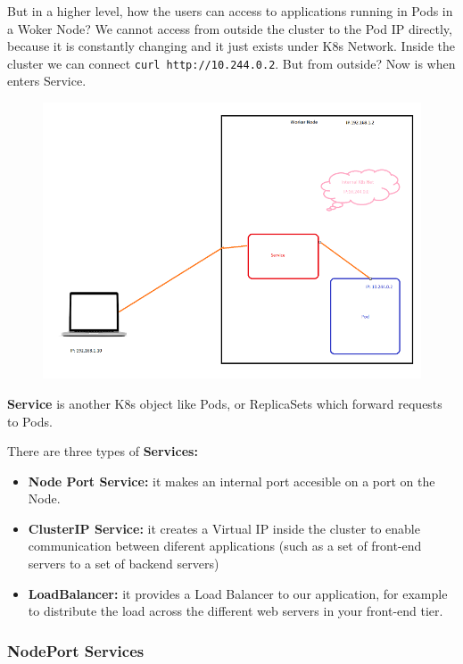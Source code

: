 \documentclass{article}
\begin{document}
But in a higher level, how the users can access to applications running in Pods in a Woker Node?
We cannot access from outside the cluster to the Pod IP directly, because it is constantly changing and it just exists under K8s Network. Inside the cluster we can connect \verb|curl http://10.244.0.2|. But from outside? Now is when enters Service.

\begin{figure}[H]
    \centering
    \includegraphics[width=\textwidth]{pictures/services2.png}
\end{figure}

\textbf{Service} is another K8s object like Pods, or ReplicaSets which forward requests to Pods.

There are three types of \textbf{Services:}
\begin{itemize}
    \item \textbf{Node Port Service:} it makes an internal port accesible on a port on the Node.
    \item \textbf{ClusterIP Service:} it creates a Virtual IP inside the cluster to enable communication between diferent applications (such as a set of front-end servers to a set of backend servers)
    \item \textbf{LoadBalancer:} it provides a Load Balancer to our application, for example to distribute the load across the different web servers in your front-end tier.
\end{itemize}

\subsubsection{NodePort Services}
\end{document}
